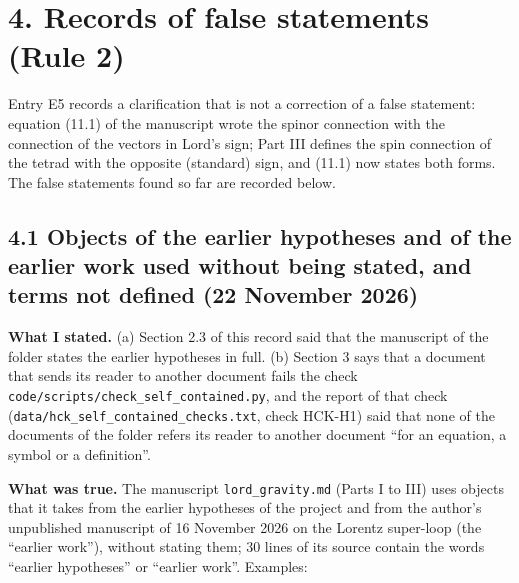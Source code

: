 \documentclass[
  10pt,
]{article}
\begin{document}
\hypertarget{records-of-false-statements-rule-2}{%
\section{4. Records of false statements (Rule
2)}\label{records-of-false-statements-rule-2}}

Entry E5 records a clarification that is not a correction of a false
statement: equation (11.1) of the manuscript wrote the spinor connection
with the connection of the vectors in Lord's sign; Part III defines the
spin connection of the tetrad with the opposite (standard) sign, and
(11.1) now states both forms. The false statements found so far are
recorded below.

\hypertarget{objects-of-the-earlier-hypotheses-and-of-the-earlier-work-used-without-being-stated-and-terms-not-defined-22-november-2026}{%
\subsection{4.1 Objects of the earlier hypotheses and of the earlier
work used without being stated, and terms not defined (22 November
2026)}\label{objects-of-the-earlier-hypotheses-and-of-the-earlier-work-used-without-being-stated-and-terms-not-defined-22-november-2026}}

\textbf{What I stated.} (a) Section 2.3 of this record said that the
manuscript of the folder states the earlier hypotheses in full. (b)
Section 3 says that a document that sends its reader to another document
fails the check \texttt{code/scripts/check\_self\_contained.py}, and the
report of that check (\texttt{data/hck\_self\_contained\_checks.txt},
check HCK-H1) said that none of the documents of the folder refers its
reader to another document ``for an equation, a symbol or a
definition''.

\textbf{What was true.} The manuscript \texttt{lord\_gravity.md} (Parts
I to III) uses objects that it takes from the earlier hypotheses of the
project and from the author's unpublished manuscript of 16 November 2026
on the Lorentz super-loop (the ``earlier work''), without stating them;
30 lines of its source contain the words ``earlier hypotheses'' or
``earlier work''. Examples:
\end{document}
